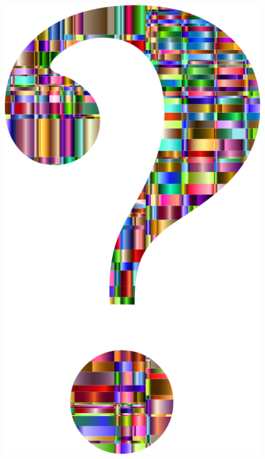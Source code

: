 \documentclass[10pt]{beamer}
\begin{document}
{\1
\begin{frame}
	\begin{figure}[p]
		\centering
		\includegraphics[scale=0.1]{questionmark.png}
	\end{figure}  
\end{frame}}
\end{document}

